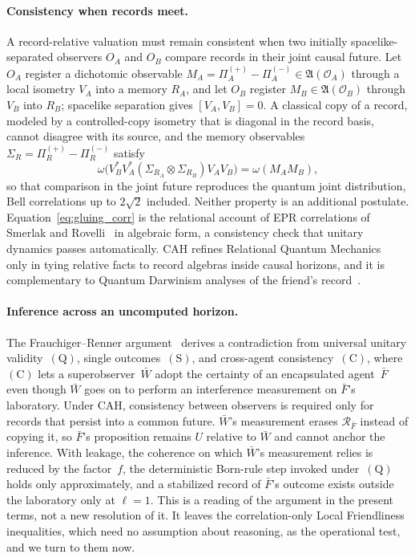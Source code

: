 \paragraph{Consistency when records meet.}
A record-relative valuation must remain consistent when two initially spacelike-separated observers $O_A$ and $O_B$ compare records in their joint causal future. Let $O_A$ register a dichotomic observable $M_A = \Pi_A^{(+)} - \Pi_A^{(-)} \in \mathfrak{A}(\mathcal{O}_A)$ through a local isometry $V_A$ into a memory $R_A$, and let $O_B$ register $M_B \in \mathfrak{A}(\mathcal{O}_B)$ through $V_B$ into $R_B$; spacelike separation gives $[V_A, V_B] = 0$. A classical copy of a record, modeled by a controlled-copy isometry that is diagonal in the record basis, cannot disagree with its source, and the memory observables $\Sigma_{R} = \Pi_{R}^{(+)} - \Pi_{R}^{(-)}$ satisfy
\begin{equation}
    \omega\bigl(V_B^* V_A^* (\Sigma_{R_A} \otimes \Sigma_{R_B}) V_A V_B\bigr) = \omega(M_A M_B),
    \label{eq:gluing_corr}
\end{equation}
so that comparison in the joint future reproduces the quantum joint distribution, Bell correlations up to $2\sqrt{2}$ included. Neither property is an additional postulate. Equation~\eqref{eq:gluing_corr} is the relational account of EPR correlations of Smerlak and Rovelli~\cite{smerlak2007} in algebraic form, a consistency check that unitary dynamics passes automatically. CAH refines Relational Quantum Mechanics~\cite{rovelli1996,dibiagio2021} only in tying relative facts to record algebras inside causal horizons, and it is complementary to Quantum Darwinism analyses of the friend's record~\cite{zurek2018,rivlin2025}.

\paragraph{Inference across an uncomputed horizon.}
The Frauchiger--Renner argument~\cite{frauchiger2018} derives a contradiction from universal unitary validity~$(\mathrm{Q})$, single outcomes~$(\mathrm{S})$, and cross-agent consistency~$(\mathrm{C})$, where $(\mathrm{C})$ lets a superobserver~$\bar{W}$ adopt the certainty of an encapsulated agent~$\bar{F}$ even though $\bar{W}$ goes on to perform an interference measurement on $\bar{F}$'s laboratory. Under CAH, consistency between observers is required only for records that persist into a common future. $\bar{W}$'s measurement erases $\mathcal{R}_{\bar{F}}$ instead of copying it, so $\bar{F}$'s proposition remains $U$ relative to $\bar{W}$ and cannot anchor the inference. With leakage, the coherence on which $\bar{W}$'s measurement relies is reduced by the factor~$f$, the deterministic Born-rule step invoked under~$(\mathrm{Q})$ holds only approximately, and a stabilized record of $\bar{F}$'s outcome exists outside the laboratory only at $\ell = 1$. This is a reading of the argument in the present terms, not a new resolution of it. It leaves the correlation-only Local Friendliness inequalities, which need no assumption about reasoning, as the operational test, and we turn to them now.
